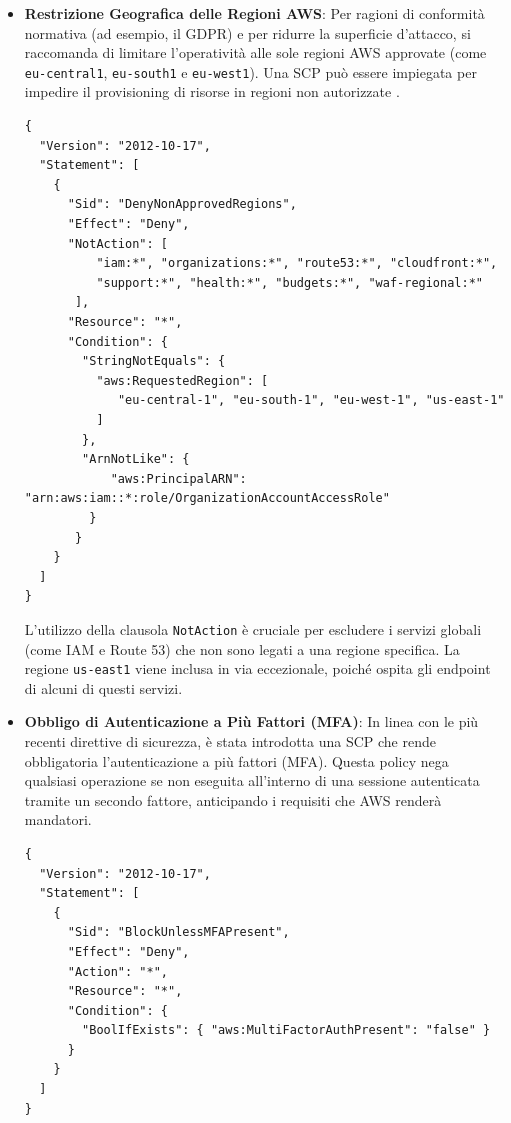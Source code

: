 \begin{itemize}
    La verifica di una policy analoga in un ambiente di sviluppo ha confermato la sua efficacia nel bloccare i tentativi di disabilitazione di tali servizi, anche quando eseguiti da utenti con privilegi amministrativi.

    \item \textbf{Restrizione Geografica delle Regioni AWS}: Per ragioni di conformità normativa (ad esempio, il GDPR) e per ridurre la superficie d'attacco, si raccomanda di limitare l'operatività alle sole regioni AWS approvate (come \texttt{eu-central\discretionary{-}{}{-}1}, \texttt{eu-south\discretionary{-}{}{-}1} e \texttt{eu-west\discretionary{-}{}{-}1}). Una SCP può essere impiegata per impedire il provisioning di risorse in regioni non autorizzate \cite{awsbuilders:scps}.

    \begin{lstlisting}[style=json, caption={SCP per limitare le regioni AWS utilizzabili}, label=lst:scp-region-restriction]
{
  "Version": "2012-10-17",
  "Statement": [
    {
      "Sid": "DenyNonApprovedRegions",
      "Effect": "Deny",
      "NotAction": [ 
          "iam:*", "organizations:*", "route53:*", "cloudfront:*", 
          "support:*", "health:*", "budgets:*", "waf-regional:*" 
       ],
      "Resource": "*",
      "Condition": {
        "StringNotEquals": {
          "aws:RequestedRegion": [
             "eu-central-1", "eu-south-1", "eu-west-1", "us-east-1" 
          ]
        },
        "ArnNotLike": { 
            "aws:PrincipalARN": "arn:aws:iam::*:role/OrganizationAccountAccessRole"
         }
       }
    }
  ]
}
    \end{lstlisting}
    
    L'utilizzo della clausola \texttt{NotAction} è cruciale per escludere i servizi globali (come IAM e Route 53) che non sono legati a una regione specifica. La regione \texttt{us-east\discretionary{-}{}{-}1} viene inclusa in via eccezionale, poiché ospita gli endpoint di alcuni di questi servizi.

    \item \textbf{Obbligo di Autenticazione a Più Fattori (MFA)}: In linea con le più recenti direttive di sicurezza, è stata introdotta una SCP che rende obbligatoria l'autenticazione a più fattori (MFA). Questa policy nega qualsiasi operazione se non eseguita all'interno di una sessione autenticata tramite un secondo fattore, anticipando i requisiti che AWS renderà mandatori.

    \begin{lstlisting}[style=json, caption={SCP per richiedere l'uso obbligatorio di MFA (\texttt{RequireMFA})}, label=lst:scp-mfa]
{
  "Version": "2012-10-17",
  "Statement": [
    {
      "Sid": "BlockUnlessMFAPresent",
      "Effect": "Deny",
      "Action": "*",
      "Resource": "*",
      "Condition": {
        "BoolIfExists": { "aws:MultiFactorAuthPresent": "false" }
      }
    }
  ]
}
    \end{lstlisting}

\end{itemize}
